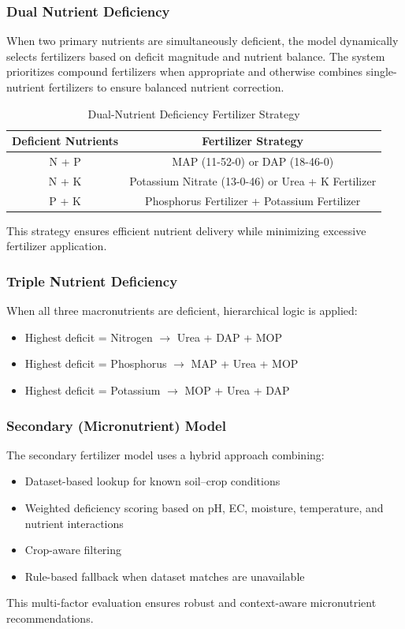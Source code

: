 \documentclass[conference]{IEEEtran}
\begin{document}
\subsubsection{Dual Nutrient Deficiency}
When two primary nutrients are simultaneously deficient, the model dynamically selects fertilizers based on deficit magnitude and nutrient balance. The system prioritizes compound fertilizers when appropriate and otherwise combines single-nutrient fertilizers to ensure balanced nutrient correction.

\begin{table}[!t]
\centering
\caption{Dual-Nutrient Deficiency Fertilizer Strategy}
\label{tab:dual-deficiency}
\begin{tabular}{cc}
\hline
Deficient Nutrients & Fertilizer Strategy \\
\hline
N + P & MAP (11-52-0) or DAP (18-46-0) \\
N + K & Potassium Nitrate (13-0-46) or Urea + K Fertilizer \\
P + K & Phosphorus Fertilizer + Potassium Fertilizer \\
\hline
\end{tabular}
\end{table}

This strategy ensures efficient nutrient delivery while minimizing excessive fertilizer application.

\subsubsection{Triple Nutrient Deficiency}
When all three macronutrients are deficient, hierarchical logic is applied:
\begin{itemize}
\item Highest deficit = Nitrogen $\rightarrow$ Urea + DAP + MOP
\item Highest deficit = Phosphorus $\rightarrow$ MAP + Urea + MOP
\item Highest deficit = Potassium $\rightarrow$ MOP + Urea + DAP
\end{itemize}

\subsubsection{Secondary (Micronutrient) Model}
The secondary fertilizer model uses a hybrid approach combining:
\begin{itemize}
\item Dataset-based lookup for known soil--crop conditions
\item Weighted deficiency scoring based on pH, EC, moisture, temperature, and nutrient interactions
\item Crop-aware filtering
\item Rule-based fallback when dataset matches are unavailable
\end{itemize}
This multi-factor evaluation ensures robust and context-aware micronutrient recommendations.
\end{document}

